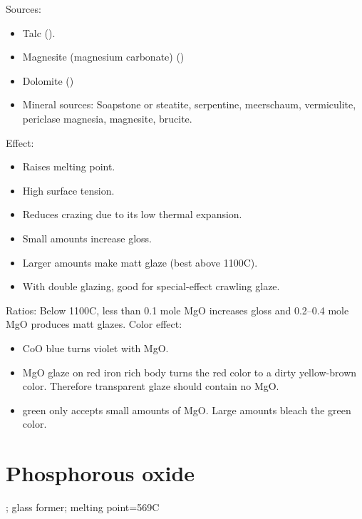 Sources:
\begin{itemize}
  \item Talc ().
  \item Magnesite (magnesium carbonate) ()
  \item Dolomite ()
  \item Mineral sources: Soapstone or steatite, serpentine, meerschaum, 
  vermiculite, periclase magnesia, magnesite, brucite.
\end{itemize}
Effect:
\begin{itemize}
  \item Raises melting point.
  \item High surface tension.
  \item Reduces crazing due to its low thermal expansion.
  \item Small amounts increase gloss.
  \item Larger amounts make matt glaze (best above 1100\degree C).
  \item With double glazing, good for special-effect crawling glaze.
\end{itemize}
Ratios: Below 1100\degree C, less than 0.1 mole MgO increases gloss and 
0.2--0.4 mole MgO produces matt glazes.
Color effect:
\begin{itemize}
  \item CoO blue turns violet with MgO.
  \item MgO glaze on red iron rich body turns the red color to a dirty 
  yellow-brown color. Therefore transparent glaze should contain no MgO.
  \item {} green only accepts small amounts of MgO. Large amounts 
  bleach the green color.
\end{itemize}
\section{Phosphorous oxide}
; glass former; melting point=569\degree C

